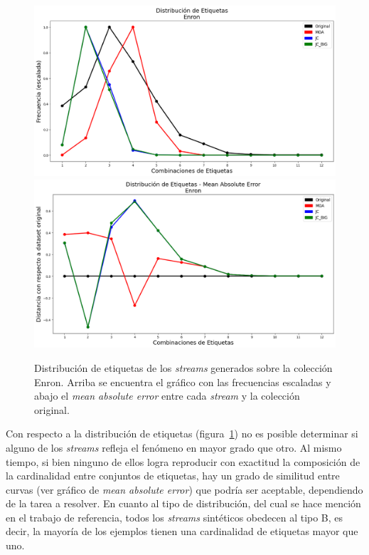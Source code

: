\begin{figure}[htbp]
	\includegraphics[width=\linewidth]{figures/experiments/syn/enron/label_distribution.png}
	\includegraphics[width=\linewidth]{figures/experiments/syn/enron/ld_mae.png}
	\caption[Distribución de etiquetas de los \textit{streams} generados sobre la colección
		Enron.]{Distribución de etiquetas de los \textit{streams} generados sobre la colección
		Enron. Arriba se encuentra el gráfico con las frecuencias escaladas y
		abajo el \textit{mean absolute error} entre cada \textit{stream} y la
		colección original.}
	\label{fig:syn_enron_label_distribution}
\end{figure}

Con respecto a la distribución de etiquetas
(figura~\ref{fig:syn_enron_label_distribution}) no es posible determinar si
alguno de los \textit{streams} refleja el fenómeno en mayor grado que otro. Al
mismo tiempo, si bien ninguno de ellos logra reproducir con exactitud la
composición de la cardinalidad entre conjuntos de etiquetas, hay un grado de
similitud entre curvas (ver gráfico de \textit{mean absolute error}) que podría
ser aceptable, dependiendo de la tarea a resolver. En cuanto al tipo de
distribución, del cual se hace mención en el trabajo de referencia, todos los
\textit{streams} sintéticos obedecen al tipo B, es decir, la mayoría de los
ejemplos tienen una cardinalidad de etiquetas mayor que uno.

